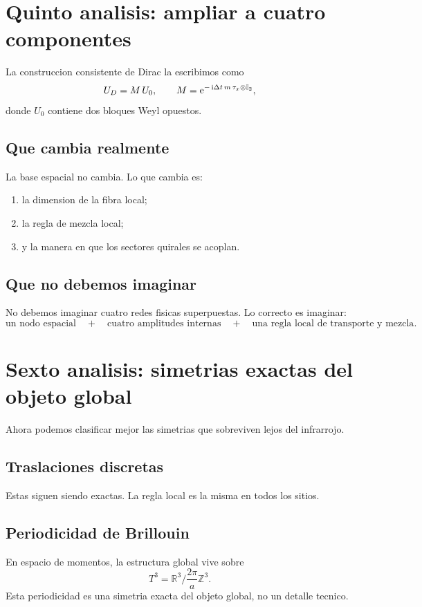 \section{Quinto analisis: ampliar a cuatro componentes}
La construccion consistente de Dirac la escribimos como
\begin{equation}
U_D = M\,U_0,
\qquad
M=\mathrm{e}^{-\,\mathrm{i} \Delta t\,m\,\tau_x\otimes\mathbb{I}_2},
\label{c31:eq:UD}
\end{equation}
donde \(U_0\) contiene dos bloques Weyl opuestos.

\subsection{Que cambia realmente}
La base espacial no cambia. Lo que cambia es:
\begin{enumerate}[label=\arabic*.]
    \item la dimension de la fibra local;
    \item la regla de mezcla local;
    \item y la manera en que los sectores quirales se acoplan.
\end{enumerate}

\subsection{Que no debemos imaginar}
No debemos imaginar cuatro redes fisicas superpuestas. Lo correcto es imaginar:
\begin{equation}
\text{un nodo espacial}
\quad+\quad
\text{cuatro amplitudes internas}
\quad+\quad
\text{una regla local de transporte y mezcla}.
\end{equation}

\section{Sexto analisis: simetrias exactas del objeto global}
Ahora podemos clasificar mejor las simetrias que sobreviven lejos del infrarrojo.

\subsection{Traslaciones discretas}
Estas siguen siendo exactas. La regla local es la misma en todos los sitios.

\subsection{Periodicidad de Brillouin}
En espacio de momentos, la estructura global vive sobre
\begin{equation}
T^3 = \mathbb{R}^3 / \frac{2\pi}{a}\mathbb{Z}^3.
\end{equation}
Esta periodicidad es una simetria exacta del objeto global, no un detalle tecnico.

